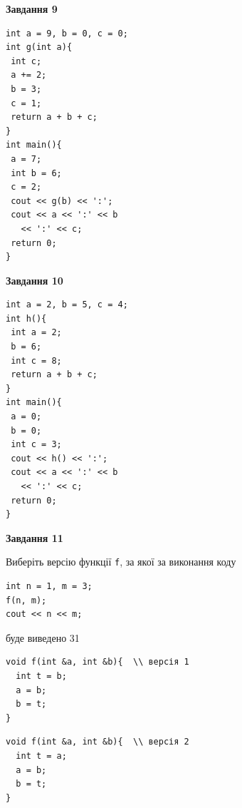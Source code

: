 \documentclass[12pt, ukrainian]{article}
\def\code#1{\Verb!#1!}
\begin{document}
{\begin {large}
\begin{minipage}[t]{11.0cm}
\end{minipage}


\begin{minipage}[t]{7.0cm}

\begin{center}
\textbf{Завдання 9}
\end{center}
\vspace{-8mm}

\begin{verbatim}
int a = 9, b = 0, c = 0;
int g(int a){
 int c;
 a += 2;
 b = 3;
 c = 1;
 return a + b + c;
}
int main(){
 a = 7;
 int b = 6;
 c = 2;
 cout << g(b) << ':';
 cout << a << ':' << b 
   << ':' << c;
 return 0;
}
\end{verbatim}



\begin{center}
\textbf{Завдання 10}
\end{center}
\vspace{-8mm}

\begin{verbatim}
int a = 2, b = 5, c = 4;
int h(){
 int a = 2;
 b = 6;
 int c = 8;
 return a + b + c;
}
int main(){
 a = 0;
 b = 0;
 int c = 3;
 cout << h() << ':';
 cout << a << ':' << b 
   << ':' << c;
 return 0;
}
\end{verbatim}

\end{minipage}
\vline \hspace{1mm}
\begin{minipage}[t]{11.0cm}

\begin{center}
\textbf{Завдання 11}
\end{center}
Виберіть версію функції \code{f}, за якої за виконання коду
\begin{verbatim}
int n = 1, m = 3;
f(n, m);
cout << n << m;
\end{verbatim}

буде виведено 31

\begin{verbatim}
void f(int &a, int &b){  \\ версія 1
  int t = b;
  a = b;
  b = t;
}
\end{verbatim}

\vspace{-8mm}\begin{verbatim}
void f(int &a, int &b){  \\ версія 2
  int t = a;
  a = b;
  b = t;
}
\end{verbatim}


\end{minipage}
\end{large}}
\end{document}
